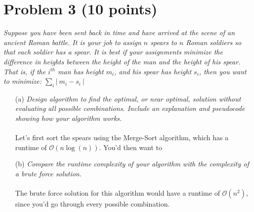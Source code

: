 \documentclass[12pt]{article}
\begin{document}
{\section*{{\selectfont Problem 3 (10 points)}}\vspace{-10mm}
\textsl{Suppose you have been sent back in time and have arrived at the scene of an ancient Roman battle. It is your job to assign $n$ spears to $n$ Roman soldiers so that each soldier has a spear. It is best if your assignments minimize the difference in heights between the height of the man and the height of his spear. That is, if the $i^{th}$ man has height $m_i$, and his spear has height $s_i$, then you want to minimize: $\sum_{i} \left| ~ m_i - s_i ~ \right|$}
\begin{enumerate}
\item[(a)]\textsl{Design algorithm to find the optimal, or near optimal, solution without evaluating all possible combinations. Include an explanation and pseudocode showing how your algorithm works.}\\ \\
Let's first sort the spears using the Merge-Sort algorithm, which has a runtime of $\mathcal{O}(n\log(n))$. You'd then want to
\item[(b)]\textsl{Compare the runtime complexity of your algorithm with the complexity of a brute force solution.}\\ \\
The brute force solution for this algorithm would have a runtime of $\mathcal{O}(n^2)$, since you'd go through every possible combination.
\end{enumerate}

}
\end{document}
